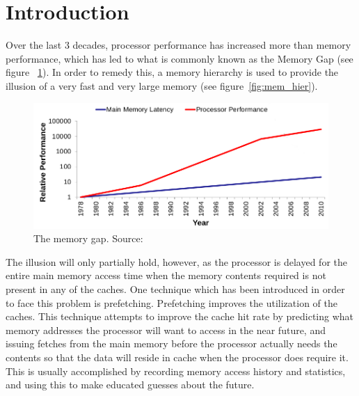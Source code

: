
\section{Introduction}
\label{sec:introduction}
Over the last 3 decades, processor performance has increased more than memory performance,
which has led to what is commonly known as the Memory Gap (see figure ~\ref{fig:mem_gap}). In order to remedy this, a memory
hierarchy is used to provide the illusion of a very fast and very
large memory (see figure~\ref{fig:mem_hier}). 

\begin{figure}[H]
	\centering
	\includegraphics[scale=0.27]{./figures/memwall}
	\caption{The memory gap. Source:\cite{tdt4260lect}}
	\label{fig:mem_gap}
\end{figure}

The illusion will only partially hold, however, as the processor is
delayed for the entire main memory access time when the memory contents required
is not present in any of the caches. One technique
which has been introduced in order to face this problem is prefetching. Prefetching improves the utilization of the caches. This technique
attempts to improve the cache hit rate by predicting what memory
addresses the processor will want to access in the near future, and
issuing fetches from the main memory before the processor actually
needs the contents so that the data will reside in cache when the
processor does require it. This is usually accomplished by recording
memory access history and statistics, and using this to make educated
guesses about the future.\cite{Grannas} 


